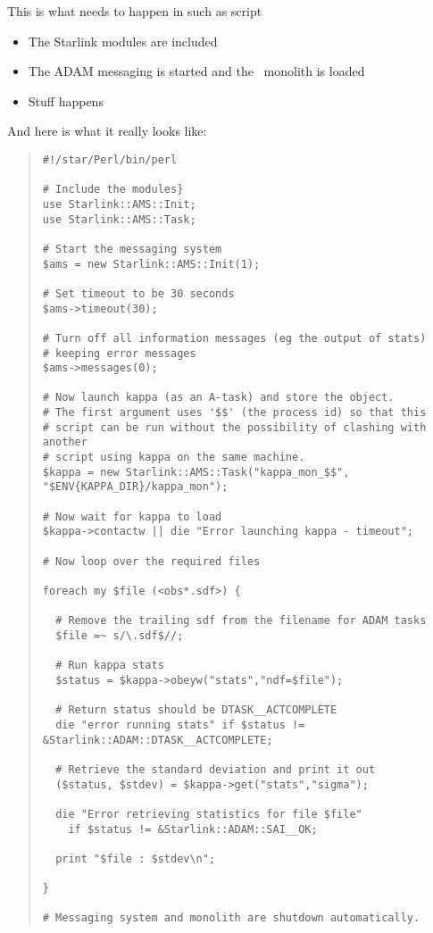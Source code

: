 \documentclass[twoside,11pt]{article}
\newenvironment{myquote}{\begin{quote}\begin{small}}{\end{small}\end{quote}}
\newcommand{\Kappa}{\xref{{\sc{Kappa}}}{sun95}{}}
\newcommand{\xref}[3]{#1}
\renewcommand{\_}{\texttt{\symbol{95}}}
\begin{document}
This is what needs to happen in such as script

\begin{itemize} 

\item The Starlink modules are included

\item The ADAM messaging is started and the \Kappa\ monolith is loaded

\item Stuff happens

\end{itemize}

And here is what it really looks like:

\begin{myquote}
\begin{verbatim}
#!/star/Perl/bin/perl

# Include the modules}
use Starlink::AMS::Init;
use Starlink::AMS::Task;

# Start the messaging system
$ams = new Starlink::AMS::Init(1);

# Set timeout to be 30 seconds
$ams->timeout(30);

# Turn off all information messages (eg the output of stats)
# keeping error messages
$ams->messages(0);

# Now launch kappa (as an A-task) and store the object.
# The first argument uses '$$' (the process id) so that this
# script can be run without the possibility of clashing with another
# script using kappa on the same machine.
$kappa = new Starlink::AMS::Task("kappa_mon_$$", "$ENV{KAPPA_DIR}/kappa_mon");

# Now wait for kappa to load
$kappa->contactw || die "Error launching kappa - timeout";

# Now loop over the required files

foreach my $file (<obs*.sdf>) {

  # Remove the trailing sdf from the filename for ADAM tasks
  $file =~ s/\.sdf$//;

  # Run kappa stats
  $status = $kappa->obeyw("stats","ndf=$file");

  # Return status should be DTASK__ACTCOMPLETE
  die "error running stats" if $status != &Starlink::ADAM::DTASK__ACTCOMPLETE;

  # Retrieve the standard deviation and print it out
  ($status, $stdev) = $kappa->get("stats","sigma");

  die "Error retrieving statistics for file $file"
    if $status != &Starlink::ADAM::SAI__OK;

  print "$file : $stdev\n";

}

# Messaging system and monolith are shutdown automatically.

\end{verbatim}
\end{myquote}
\end{document}
